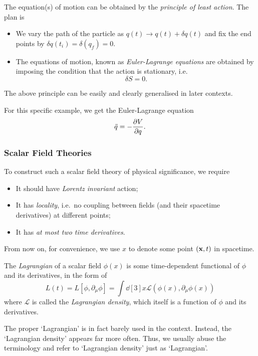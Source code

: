 \documentclass[a4paper,11pt]{article}
\begin{document}
	The equation(s) of motion can be obtained by the \emph{principle of least action}. The plan is
	\begin{itemize}
		\item We vary the path of the particle as $q(t) \to q(t) + \delta q(t)$ and fix the end points by $\delta q(t_i) = \delta(q_f) = 0$.
		\item The equations of motion, known as \emph{Euler-Lagrange equations} are obtained by imposing the condition that the action is stationary, i.e. \[
			\delta S = 0.
		\]
	\end{itemize}

	The above principle can be easily and clearly generalised in later contexts.

	For this specific example, we get the Euler-Lagrange equation
	\begin{equation}
		\ddot{q} = - \pdv{V}{q}.
	\end{equation}
	
	\subsubsection{Scalar Field Theories}
	
	To construct such a scalar field theory of physical significance, we require
	\begin{itemize}
		\item It should have \emph{Lorentz invariant} action;
		\item It has \emph{locality}, i.e.\ no coupling between fields (and their spacetime derivatives) at different points;
		\item It has \emph{at most two time derivatives}.
	\end{itemize}

	From now on, for convenience, we use $x$ to denote some point $(\vb x,t)$ in spacetime.

	\begin{defi}
		The \emph{Lagrangian} of a scalar field $\phi(x)$ is some time-dependent functional of $\phi$ and its derivatives, in the form of
		\begin{equation}
			L(t) = L [\phi, \partial_\mu \phi] = \int \dd[3]{x} \mathcal{L}(\phi(x),\partial_\mu \phi(x))
		\end{equation}
		where $\mathcal{L}$ is called the \emph{Lagrangian density}, which itself is a function of $\phi$ and its derivatives.
	\end{defi}

	\begin{nt}
		The proper `Lagrangian' is in fact barely used in the context. Instead, the `Lagrangian density' appears far more often. Thus, we usually abuse the terminology and refer to `Lagrangian density' just as `Lagrangian'.
	\end{nt}
\end{document}
